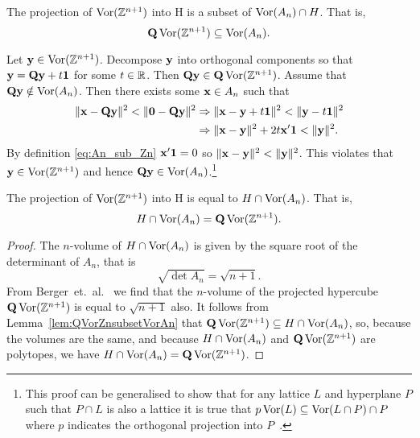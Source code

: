 \documentclass[draftcls, onecolumn, 11pt]{IEEEtran}
\begin{document}
\begin{lemma} \label{lem:QVorZnsubsetVorAn}
The projection of $\operatorname{Vor}({\mathbb Z}^{n+1})$ into H is a subset of $\operatorname{Vor}(A_{n}) \cap H$.  That is,
\[
\mathbf{Q}\operatorname{Vor}({\mathbb Z}^{n+1}) \subseteq \operatorname{Vor}(A_{n}).
\]
\end{lemma}
\begin{IEEEproof}
Let $\mathbf{y} \in \operatorname{Vor}({\mathbb Z}^{n+1})$.  Decompose $\mathbf{y}$ into orthogonal components so that $\mathbf{y} = \mathbf{Q} \mathbf{y} + t \boldsymbol{1}$ for some $t \in {\mathbb R}$.  Then $\mathbf{Q}\mathbf{y} \in \mathbf{Q}\operatorname{Vor}({\mathbb Z}^{n+1})$.  Assume that $\mathbf{Q}\mathbf{y} \notin \operatorname{Vor}(A_n)$.  Then there exists some $\mathbf{x} \in A_n$ such that
\begin{align*}
\|\mathbf{x} - \mathbf{Q}\mathbf{y}\|^2 < \|\boldsymbol{0} - \mathbf{Q}\mathbf{y}\|^2 & \Rightarrow \|\mathbf{x} - \mathbf{y} + t\boldsymbol{1}\|^2 < \|\mathbf{y} - t\boldsymbol{1}\|^2 \\
& \Rightarrow \|\mathbf{x} - \mathbf{y}\|^2 + 2t\mathbf{x}'\boldsymbol{1} < \|\mathbf{y}\|^2.
\end{align*}
By definition \eqref{eq:An_sub_Zn} $\mathbf{x}'\boldsymbol{1} = 0$ so $\|\mathbf{x} - \mathbf{y}\|^2 < \|\mathbf{y}\|^2$.  This violates that $\mathbf{y} \in \operatorname{Vor}({\mathbb Z}^{n+1})$ and hence $\mathbf{Q}\mathbf{y} \in \operatorname{Vor}(A_n)$.\footnote{This proof can be generalised to show that for any lattice $L$ and hyperplane $P$ such that $P\cap L$ is also a lattice it is true that $p\operatorname{Vor}(L) \subseteq \operatorname{Vor}(L \cap P) \cap P$ where $p$ indicates the orthogonal projection into $P$~\cite[Lemma~2.1]{McKilliam2010thesis}.}
\end{IEEEproof}

\begin{theorem}  \label{thm:VorAn=QVorZn1}
The projection of $\operatorname{Vor}({\mathbb Z}^{n+1})$ into H is equal to $H \cap \operatorname{Vor}(A_{n})$. That is,
\[
H \cap \operatorname{Vor}(A_n) = \mathbf{Q}\operatorname{Vor}({\mathbb Z}^{n+1}).
\]
\end{theorem}
\begin{proof}
The $n$-volume of $H \cap \operatorname{Vor}(A_n)$ is given by the square root of the determinant of $A_n$, that is 
\[
\sqrt{\det{A_n}} = \sqrt{n + 1}.
\]  
From Berger~et.~al.~\cite[Theorem 1.1]{Burger1996} we find that the $n$-volume of the projected hypercube $\mathbf{Q}\operatorname{Vor}({\mathbb Z}^{n+1})$ is equal to $\sqrt{n + 1}$ also. It follows from Lemma~\ref{lem:QVorZnsubsetVorAn} that $\mathbf{Q}\operatorname{Vor}({\mathbb Z}^{n+1}) \subseteq H \cap \operatorname{Vor}(A_n)$, so, because the volumes are the same, and because $H \cap \operatorname{Vor}(A_n)$ and $\mathbf{Q}\operatorname{Vor}({\mathbb Z}^{n+1})$ are polytopes, we have $H \cap \operatorname{Vor}(A_n) = \mathbf{Q}\operatorname{Vor}({\mathbb Z}^{n+1})$.
\end{proof} 
\end{document}
